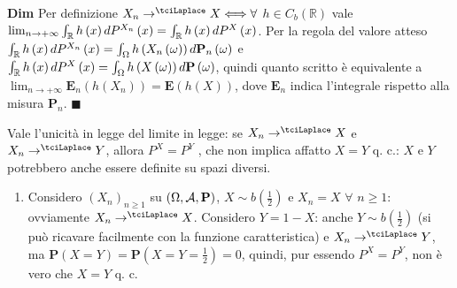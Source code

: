 \documentclass{article}
\begin{document}
\textbf{Dim} Per definizione $X_{n}\rightarrow ^{\tciLaplace
}X\Longleftrightarrow \forall $ $h\in C_{b}\left( 
\mathbb{R}
\right) $ vale $\lim_{n\rightarrow +\infty }\int_{%
\mathbb{R}
}h\left( x\right) dP^{X_{n}}\left( x\right) =\int_{%
\mathbb{R}
}h\left( x\right) dP^{X}\left( x\right) $. Per la regola del valore atteso $%
\int_{%
\mathbb{R}
}h\left( x\right) dP^{X_{n}}\left( x\right) =\int_{\Omega }h\left(
X_{n}\left( \omega \right) \right) d\mathbf{P}_{n}\left( \omega \right) $ e $%
\int_{%
\mathbb{R}
}h\left( x\right) dP^{X}\left( x\right) =\int_{\Omega }h\left( X\left(
\omega \right) \right) d\mathbf{P}\left( \omega \right) $, quindi quanto
scritto \`{e} equivalente a $\lim_{n\rightarrow +\infty }\mathbf{E}%
_{n}\left( h\left( X_{n}\right) \right) =\mathbf{E}\left( h\left( X\right)
\right) $, dove $\mathbf{E}_{n}$ indica l'integrale rispetto alla misura $%
\mathbf{P}_{n}$. $\blacksquare $

Vale l'unicit\`{a} in legge del limite in legge: se $X_{n}\rightarrow
^{\tciLaplace }X$ e $X_{n}\rightarrow ^{\tciLaplace }Y$, allora $P^{X}=P^{Y}$%
, che non implica affatto $X=Y$ q. c.: $X$ e $Y$ potrebbero anche essere
definite su spazi diversi.

\begin{enumerate}
\item Considero $\left( X_{n}\right) _{n\geq 1}$ su $\left( \Omega ,\mathcal{%
A},\mathbf{P}\right) $, $X\sim b\left( \frac{1}{2}\right) $ e $X_{n}=X$ $%
\forall $ $n\geq 1$: ovviamente $X_{n}\rightarrow ^{\tciLaplace }X$.
Considero $Y=1-X$: anche $Y\sim b\left( \frac{1}{2}\right) $ (si pu\`{o}
ricavare facilmente con la funzione caratteristica) e $X_{n}\rightarrow
^{\tciLaplace }Y$, ma $\mathbf{P}\left( X=Y\right) =\mathbf{P}\left( X=Y=%
\frac{1}{2}\right) =0$, quindi, pur essendo $P^{X}=P^{Y}$, non \`{e} vero
che $X=Y$ q. c.
\end{enumerate}
\end{document}
